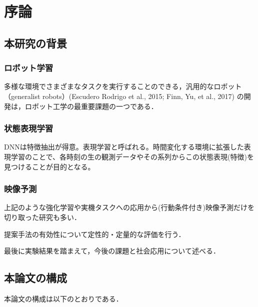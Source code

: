 \chapter{序論}
\label{chap:introduction}
\section{本研究の背景}

\subsection{ロボット学習}

多様な環境でさまざまなタスクを実行することのできる，汎用的なロボット（generalist robots）(Escudero Rodrigo et al., 2015; Finn, Yu, et al., 2017) の開発は，ロボット工学の最重要課題の一つである．

\subsection{状態表現学習}
DNNは特徴抽出が得意。表現学習と呼ばれる。時間変化する環境に拡張した表現学習のことで、各時刻の生の観測データやその系列からこの状態表現(特徴)を見つけることが目的となる。

\subsection{映像予測}
上記のような強化学習や実機タスクへの応用から(行動条件付き)映像予測だけを切り取った研究も多い．

提案手法の有効性について定性的・定量的な評価を行う．

最後に実験結果を踏まえて，今後の課題と社会応用について述べる．

\section{本論文の構成}
本論文の構成は以下のとおりである．







